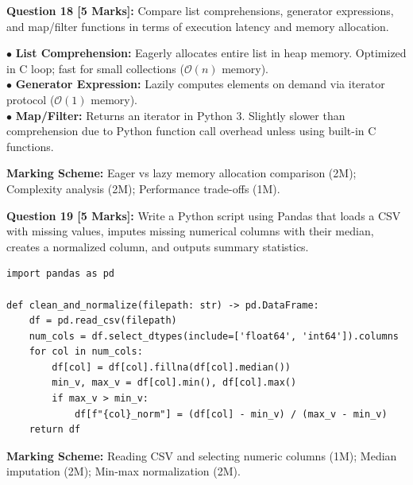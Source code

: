 \noindent\textbf{Question 18 [5 Marks]:} Compare list comprehensions, generator expressions, and map/filter functions in terms of execution latency and memory allocation.
\begin{solutionbox}
$\bullet$ \textbf{List Comprehension:} Eagerly allocates entire list in heap memory. Optimized in C loop; fast for small collections ($\mathcal{O}(n)$ memory).\\
$\bullet$ \textbf{Generator Expression:} Lazily computes elements on demand via iterator protocol ($\mathcal{O}(1)$ memory).\\
$\bullet$ \textbf{Map/Filter:} Returns an iterator in Python 3. Slightly slower than comprehension due to Python function call overhead unless using built-in C functions.
\end{solutionbox}
\begin{markingrubric}
\textbf{Marking Scheme:} Eager vs lazy memory allocation comparison (2M); Complexity analysis (2M); Performance trade-offs (1M).
\end{markingrubric}

\noindent\textbf{Question 19 [5 Marks]:} Write a Python script using Pandas that loads a CSV with missing values, imputes missing numerical columns with their median, creates a normalized column, and outputs summary statistics.
\begin{solutionbox}
\begin{lstlisting}
import pandas as pd

def clean_and_normalize(filepath: str) -> pd.DataFrame:
    df = pd.read_csv(filepath)
    num_cols = df.select_dtypes(include=['float64', 'int64']).columns
    for col in num_cols:
        df[col] = df[col].fillna(df[col].median())
        min_v, max_v = df[col].min(), df[col].max()
        if max_v > min_v:
            df[f"{col}_norm"] = (df[col] - min_v) / (max_v - min_v)
    return df
\end{lstlisting}
\end{solutionbox}
\begin{markingrubric}
\textbf{Marking Scheme:} Reading CSV and selecting numeric columns (1M); Median imputation (2M); Min-max normalization (2M).
\end{markingrubric}

